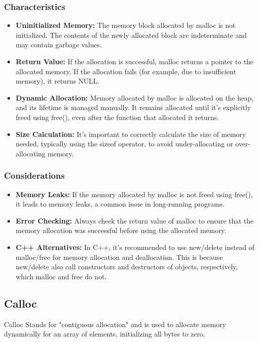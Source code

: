 \documentclass{report}
\begin{document}
    \subsubsection{Characteristics}
    \bigbreak \noindent 
    \begin{itemize}
        \item \textbf{Uninitialized Memory:} The memory block allocated by malloc is not initialized. The contents of the newly allocated block are indeterminate and may contain garbage values.
        \item \textbf{Return Value:} If the allocation is successful, malloc returns a pointer to the allocated memory. If the allocation fails (for example, due to insufficient memory), it returns NULL.
        \item \textbf{Dynamic Allocation:} Memory allocated by malloc is allocated on the heap, and its lifetime is managed manually. It remains allocated until it's explicitly freed using free(), even after the function that allocated it returns.
        \item \textbf{Size Calculation:} It's important to correctly calculate the size of memory needed, typically using the sizeof operator, to avoid under-allocating or over-allocating memory.
    \end{itemize}
    \bigbreak \noindent 
    \subsubsection{Considerations}
    \begin{itemize}
        \item \textbf{Memory Leaks:} If the memory allocated by malloc is not freed using free(), it leads to memory leaks, a common issue in long-running programs.
        \item \textbf{Error Checking:} Always check the return value of malloc to ensure that the memory allocation was successful before using the allocated memory.
        \item \textbf{C++ Alternatives:} In C++, it's recommended to use new/delete instead of malloc/free for memory allocation and deallocation. This is because new/delete also call constructors and destructors of objects, respectively, which malloc and free do not.
    \end{itemize}

    \pagebreak 
    \subsection{Calloc}
    \bigbreak \noindent 
    \begin{concept}
        Calloc Stands for "contiguous allocation" and is used to allocate memory dynamically for an array of elements, initializing all bytes to zero.
    \end{concept}
    \bigbreak \noindent 
\end{document}
